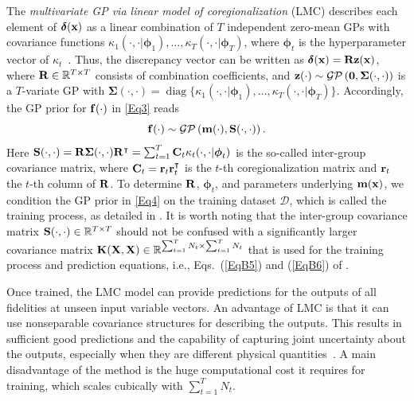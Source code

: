 \documentclass[iicol,sn-basic]{sn-jnl}%
\DeclareMathOperator{\diag}{diag}
\begin{document}
The \textit{multivariate GP via linear model of coregionalization} (LMC) describes each element of ${\boldsymbol \delta}({\bf x})$ as a linear combination of $T$ independent zero-mean GPs with covariance functions $\kappa_1(\cdot,\cdot|{\boldsymbol \phi}_1),\dots,\kappa_T(\cdot,\cdot|{\boldsymbol \phi}_T)$, where ${\boldsymbol \phi}_t$ is the hyperparameter vector of $\kappa_t$~\citep[see e.g.,][]{Chiles1999,Fricker2013}.
Thus, the discrepancy vector can be written as ${\boldsymbol \delta}({\bf x}) = {\bf R} {\bf z}({\bf x})$, where ${\bf R} \in \mathbb{R}^{T \times T}$ consists of combination coefficients, and ${\bf z}(\cdot) \sim \mathcal{GP}\left({\bf 0},{\boldsymbol \Sigma}(\cdot,\cdot)\right)$ is a $T$-variate GP with ${\boldsymbol \Sigma}(\cdot,\cdot) = \diag\{\kappa_1(\cdot,\cdot|{\boldsymbol \phi}_1),\dots,\kappa_T(\cdot,\cdot|{\boldsymbol \phi}_T)\}$.
Accordingly, the GP prior for ${\bf f}(\cdot)$ in \cref{Eq3} reads
\begin{equation}\label{Eq4}
	{\bf f}(\cdot) \sim \mathcal{GP}\left({\bf m}(\cdot),{\bf S}(\cdot,\cdot)\right).
\end{equation}
Here 
${\bf S}(\cdot,\cdot) = {\bf R} {\boldsymbol \Sigma}(\cdot,\cdot) {\bf R}^\intercal = \sum_{t=1}^T {\bf C}_t \kappa_t(\cdot,\cdot|{\boldsymbol \phi}_t)$ is the so-called inter-group covariance matrix, where ${\bf C}_t = {\bf r}_t {\bf r}_t^\intercal$ is the $t$-th coregionalization matrix and ${\bf r}_t$ the $t$-th column of ${\bf R}$.
To determine ${\bf R}$, ${\boldsymbol \phi}_t$, and parameters underlying ${\bf m}({\bf x})$, we condition the GP prior in \cref{Eq4} on the training dataset $\mathcal{D}$, which is called the training process, as detailed in . 
It is worth noting that the inter-group covariance matrix ${\bf S}(\cdot,\cdot) \in \mathbb{R}^{T \times T}$ should not be confused with a significantly larger covariance matrix ${\bf K}({\bf X},{\bf X}) \in \mathbb{R}^{\sum_{t=1}^{T}N_t \times \sum_{t=1}^{T}N_t}$ that is used for the training process and prediction equations, i.e., Eqs.~(\ref{EqB5}) and (\ref{EqB6}) of .

Once trained, the LMC model can provide predictions for the outputs of all fidelities at unseen input variable vectors.
An advantage of LMC is that it can use nonseparable covariance structures for describing the outputs.
This results in sufficient good predictions and the capability of capturing joint uncertainty about the outputs, especially when they are different physical quantities~\citep{Fricker2013}.
A main disadvantage of the method is the huge computational cost it requires for training, which scales cubically with $\sum_{t=1}^{T}N_t$.
\end{document}
